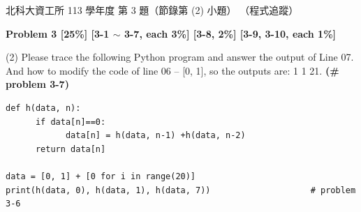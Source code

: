 \begin{pastexam}[label={px:ntut-113-prog-02}]{北科大資工所 113 學年度 第 3 題（節錄第 (2) 小題）}
（程式追蹤）

\textbf{Problem 3 [25\%] [3-1 $\sim$ 3-7, each 3\%] [3-8, 2\%] [3-9, 3-10, each 1\%]}

(2) Please trace the following Python program and answer the output of Line 07. And how to modify the code of
line 06 -- [0, 1], so the outputs are: 1 1 21. \textbf{(\# problem 3-7)}
\begin{verbatim}
def h(data, n):
      if data[n]==0:
            data[n] = h(data, n-1) +h(data, n-2)
      return data[n]

data = [0, 1] + [0 for i in range(20)]
print(h(data, 0), h(data, 1), h(data, 7))                    # problem 3-6
\end{verbatim}
\end{pastexam}

